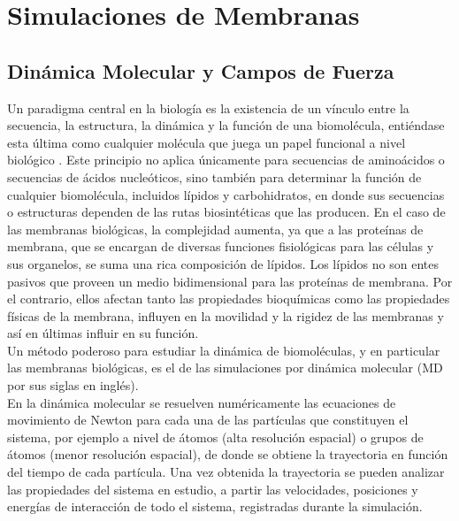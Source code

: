 \chapter{Simulaciones de Membranas}
\section{Din\'{a}mica Molecular y Campos de Fuerza}\label{ss:md} 
Un paradigma central en la biolog\'{i}a es la existencia de un v\'{i}nculo entre la secuencia, la estructura, la din\'{a}mica y la funci\'{o}n de una biomol\'{e}cula, enti\'{e}ndase esta \'{u}ltima como cualquier mol\'{e}cula que juega un papel funcional a nivel biol\'{o}gico \cite{Cui2006}. Este principio no aplica \'{u}nicamente para secuencias de amino\'{a}cidos o secuencias de \'{a}cidos nucle\'{o}ticos, sino tambi\'{e}n para determinar la funci\'{o}n de cualquier biomol\'{e}cula, incluidos l\'{i}pidos y carbohidratos, en donde sus secuencias o estructuras dependen de las rutas biosint\'{e}ticas que las producen. En el caso de las membranas biol\'{o}gicas, la complejidad aumenta, ya que a las prote\'{i}nas de membrana, que se encargan de diversas funciones fisiol\'{o}gicas para las c\'{e}lulas y sus organelos, se suma una rica composici\'{o}n de l\'{i}pidos. Los l\'{i}pidos no son entes pasivos que proveen un medio bidimensional para las prote\'{i}nas de membrana. Por el contrario, ellos afectan tanto las propiedades bioqu\'{i}micas como las propiedades f\'{i}sicas de la membrana, influyen en la movilidad y la rigidez de las membranas y as\'{i} en \'{u}ltimas influir en su funci\'{o}n.\\

Un m\'{e}todo poderoso para estudiar la din\'{a}mica de biomol\'{e}culas, y en particular las membranas biol\'{o}gicas, es el de las simulaciones por din\'{a}mica molecular (MD por sus siglas en ingl\'{e}s).\\

En la din\'{a}mica molecular se resuelven num\'{e}ricamente las ecuaciones de movimiento de Newton para cada una de las part\'{i}culas que constituyen el sistema, por ejemplo a nivel de \'{a}tomos (alta resoluci\'{o}n espacial) o grupos de \'{a}tomos (menor resoluci\'{o}n espacial), de donde se obtiene la trayectoria en funci\'{o}n del tiempo de cada part\'{i}cula. Una vez obtenida la trayectoria se pueden analizar las propiedades del sistema en estudio, a partir las velocidades, posiciones y energ\'{i}as de interacci\'{o}n de todo el sistema, registradas durante la simulaci\'{o}n.\\

